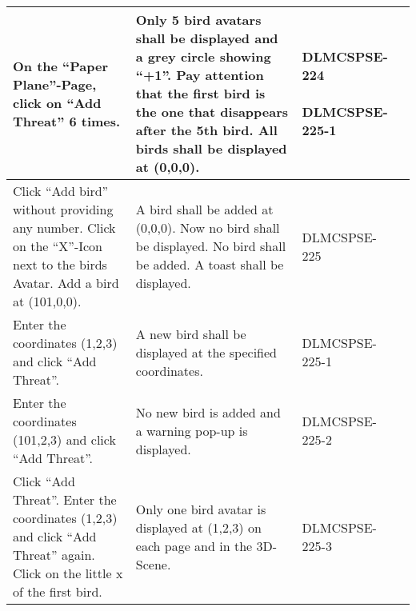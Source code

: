 \begin{xltabular}{\textwidth}{|X|X|M{2cm}|M{2cm}|}
\hline 
 \endlastfoot 
On the \enquote{Paper Plane}-Page, click on \enquote{Add Threat} 6 times. & Only 5 bird avatars shall be displayed and a grey circle showing {\ttfamily\enquote{+1}}. Pay attention that the first bird is the one that disappears after the 5th bird. \newline All birds shall be displayed at {\ttfamily(0,0,0)}. & {\color{purpleT}\ttfamily DLMCSPSE-224 \newline\newline DLMCSPSE-225-1} &  \\ \hline 
  Click \enquote{Add bird} without providing any number. \newline Click on the \enquote{X}-Icon next to the birds Avatar. \newline Add a bird at {\ttfamily (101,0,0)}. & A bird shall be added at {\ttfamily (0,0,0)}. \newline Now no bird shall be displayed. \newline No bird shall be added. A toast shall be displayed. & {\color{purpleT}\ttfamily DLMCSPSE-225} &  \\ \hline 
  Enter the coordinates {\ttfamily(1,2,3)} and click \enquote{Add Threat}. & A new bird shall be displayed at the specified coordinates. & {\color{purpleT}\ttfamily DLMCSPSE-225-1} &  \\ \hline 
  Enter the coordinates {\ttfamily (101,2,3)} and click \enquote{Add Threat}. & No new bird is added and a warning pop-up is displayed. & {\color{purpleT}\ttfamily DLMCSPSE-225-2} &  \\ \hline 
  Click \enquote{Add Threat}. Enter the coordinates {\ttfamily (1,2,3)} and click \enquote{Add Threat} again. \newline Click on the little x of the first bird. & Only one bird avatar is displayed at {\ttfamily (1,2,3)} on each page and in the 3D-Scene. & {\color{purpleT}\ttfamily DLMCSPSE-225-3} &  \\ \hline 

\end{xltabular}
